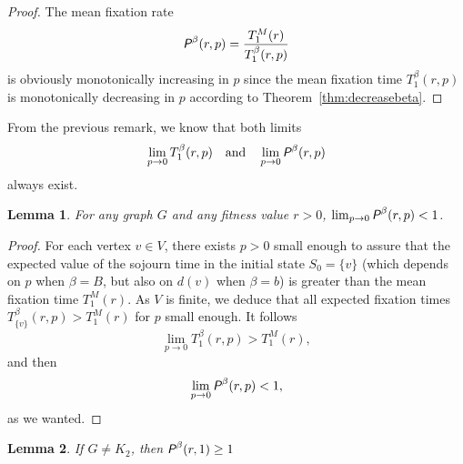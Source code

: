 \documentclass[a4paper,english,10pt]{amsart}
\newcommand{\Rho}{\emph{\textsf{P\hspace{0.1ex}}}}
\newtheorem{lemma}{\bf Lemma}[section]
\theoremstyle{definition}
\numberwithin{equation}{section}
\begin{document}
\begin{proof} The mean fixation rate 
$$
\Rho^\beta(r,p) = \frac{T^M_1(r)}{T^\beta_1(r,p)}
$$
is obviously monotonically increasing in $p$ since the mean fixation time $T^\beta_1(r,p)$ is monotonically decreasing in $p$ according to Theorem~\ref{thm:decreasebeta}.
\end{proof}

From the previous remark, we know that both limits
$$
\lim_{p \to 0} T^\beta_1 (r,p) \quad \text{and} \quad \lim_{p \to 0}\Rho^\beta(r,p)
$$ 
always exist.

\begin{lemma} \label{lem:2}
For any graph $G$ and any fitness value $r > 0$, 
$\lim_{p \to 0}\Rho^\beta(r,p) < 1$.
\end{lemma}

\begin{proof} For each vertex $v \in V$, there exists $p > 0$ small enough to assure that the expected value of the sojourn time in the initial state $S_0 =\{v\}$ (which depends on $p$ when $\beta = B$, but also on $d(v)$ when $\beta = b$) is greater than the mean fixation time $T^M_1(r)$. 
As $V$ is finite, we deduce that all expected fixation times $T^\beta_{\{v\}} (r,p) > T^M_1(r)$ for $p$ small enough. It follows   
$$\lim_{p \to 0} T^\beta_1 (r,p) > T^M_1(r),$$
and then 
$$
\lim_{p \to 0}\Rho^\beta(r,p) < 1, 
$$
as we wanted. 
\end{proof}

%

\begin{lemma} \label{lem:3}
If $G \neq K_2$, then $\Rho^\beta(r,1) \geq 1$
\end{lemma}
\end{document}
